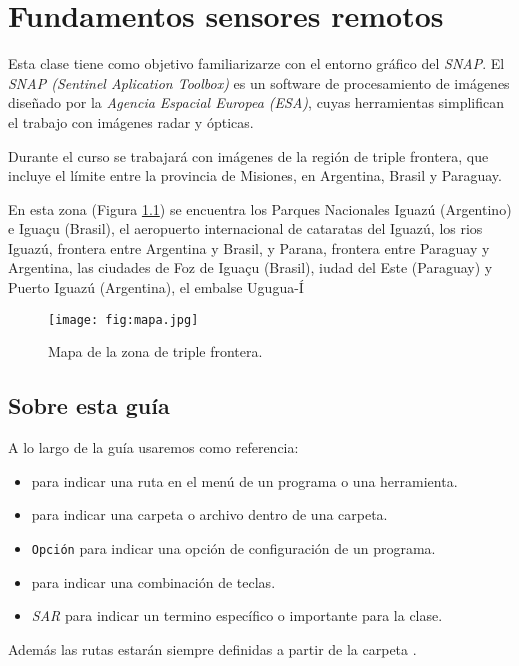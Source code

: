 \chapter{Fundamentos sensores remotos}

Esta clase tiene como objetivo familiarizarze con el entorno gráfico del \emph{SNAP}. El \emph{SNAP (Sentinel Aplication Toolbox)} es un  software de procesamiento de imágenes diseñado por la \emph{Agencia Espacial Europea (ESA)}, cuyas herramientas simplifican el trabajo con imágenes radar y ópticas.

Durante el curso se trabajará con imágenes de la región de triple frontera, que incluye el límite entre la provincia de Misiones, en Argentina, Brasil y Paraguay.

En esta zona (Figura \ref{fig:mapa}) se encuentra los Parques Nacionales Iguazú (Argentino) e Iguaçu (Brasil), el aeropuerto internacional de cataratas del Iguazú, los rios Iguazú, frontera entre Argentina y Brasil, y Parana, frontera entre Paraguay y Argentina, las ciudades de Foz de Iguaçu (Brasil), iudad del Este (Paraguay) y Puerto Iguazú (Argentina), el embalse Ugugua-Í

\begin{figure}[h!]
    \centering
    \texttt{[image: fig:mapa.jpg]}
    \caption{Mapa de la zona de triple frontera.}
    \label{fig:mapa}
\end{figure}

\section{Sobre esta guía}

A lo largo de la guía usaremos como referencia:

\begin{itemize}
  \item {} para indicar una ruta en el menú de un programa o una herramienta.
  \item {} para indicar una carpeta o archivo dentro de una carpeta.
  \item \texttt{Opción} para indicar una opción de configuración de un programa.
  \item {} para indicar una combinación de teclas.
  \item \emph{SAR} para indicar un termino específico o importante para la clase.
\end{itemize}

Además las rutas estarán siempre definidas a partir de la carpeta .

